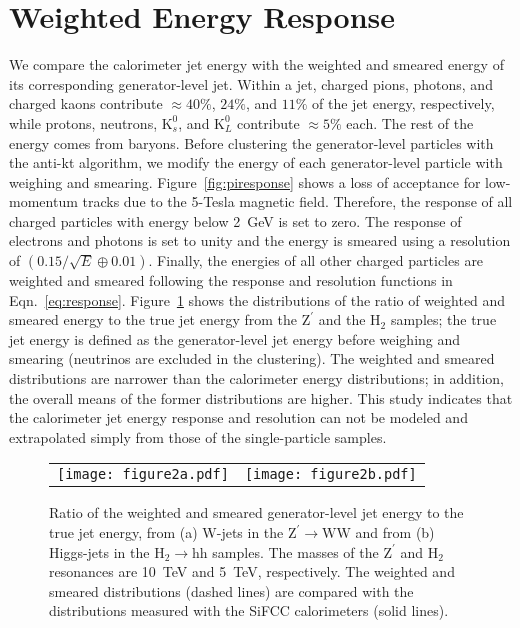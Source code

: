 \documentclass{PoS}
\begin{document}
\section{Weighted Energy Response \label{sec:weight}}
We compare the calorimeter jet energy with the weighted 
and smeared energy of its corresponding generator-level jet. 
Within a jet, charged pions, photons, and charged kaons 
contribute $\approx 40\%$, $24\%$, and $11\%$ of the jet energy, respectively, 
while protons, neutrons, $\mathrm{K}_{s}^0$, and $\mathrm{K}_{L}^0$ contribute 
$\approx 5\%$ each. The rest of the energy comes from baryons. 
Before clustering the generator-level particles with the anti-kt algorithm, 
we modify the energy of each generator-level particle with weighing and 
smearing. %
Figure~\ref{fig:piresponse} shows a 
loss of acceptance for low-momentum tracks due to the 5-Tesla magnetic field. 
Therefore, the response of all charged particles with energy below 2~GeV is 
set to zero. The response of electrons and photons 
is set to unity and the energy is smeared using a resolution 
of $\left(0.15/\sqrt{E} \oplus 0.01\right)$. Finally, the energies
of all other charged particles are weighted and smeared 
following the response and resolution functions in 
Eqn.~\ref{eq:response}. 
%
Figure~\ref{fig:weight} shows the distributions of the ratio of 
weighted and smeared energy to the true jet energy from the $\mathrm{Z}^{\prime}$ 
and the $\mathrm{H}_2$ samples; the true jet energy is defined as the 
generator-level jet energy before weighing and smearing (neutrinos are 
excluded in the clustering). The weighted and smeared distributions are 
narrower than the calorimeter energy distributions; in addition, the overall 
means of the former distributions are higher. This study indicates that the 
calorimeter jet energy response and resolution can not be modeled and 
extrapolated simply from those of the single-particle samples. 



\begin{figure}
\begin{center}
\begin{tabular}{cc}
\texttt{[image: figure2a.pdf]} &
\texttt{[image: figure2b.pdf]} \\
\end{tabular}
\end{center}
\caption{Ratio of the weighted and smeared generator-level jet energy to 
 the true jet energy, from (a) W-jets in the 
$\mathrm{Z}^{\prime}\rightarrow \mathrm{WW}$ and from (b) Higgs-jets in 
the $\mathrm{H}_2\rightarrow \mathrm{hh}$ samples. The masses 
of the $\mathrm{Z}^{\prime}$ and $\mathrm{H}_2$ resonances 
are 10~TeV and 5~TeV, respectively. The weighted and smeared distributions 
(dashed lines) are compared with the distributions measured 
with the SiFCC calorimeters (solid lines).}
\label{fig:weight}
\end{figure}
\end{document}
